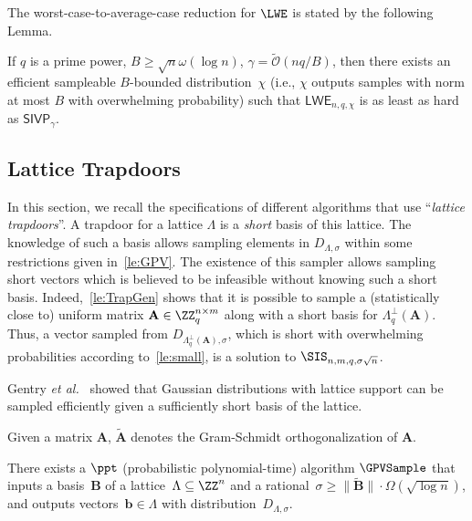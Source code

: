 The worst-case-to-average-case reduction for $\LWE$ is stated by the following Lemma.

\begin{lemma} \label{le:lwe-hard}
  If $q$ is a prime power, $B \geq \sqrt{n}\omega(\log n)$, $\gamma= \widetilde{\mathcal{O}}(nq/B)$, then there exists an efficient sampleable $B$-bounded distribution~$\chi$ ({i.e.}, $\chi$ outputs samples with norm at most $B$ with overwhelming probability) such that $\mathsf{LWE}_{n,q,\chi}$ is as least as hard as $\mathsf{SIVP}_{\gamma}$.
\end{lemma}

\subsection{Lattice Trapdoors}
\label{sse:lattice-trapdoors}

In this section, we recall the specifications of different algorithms that use ``\textit{lattice trapdoors}''.
A trapdoor for a lattice $\Lambda$ is a \textit{short} basis of this lattice.
The knowledge of such a basis allows sampling elements in $D_{\Lambda, \sigma}$ within some restrictions given in~\cref{le:GPV}.
The existence of this sampler allows sampling short vectors which is believed to be infeasible without knowing such a short basis.
Indeed,~\cref{le:TrapGen} shows that it is possible to sample a (statistically close to) uniform matrix $\mathbf{A} \in \ZZ_q^{n \times m}$ along with a short basis for $\Lambda^\perp_{q}(\mathbf{A})$.
Thus, a vector sampled from $D_{\Lambda^\perp_{q}(\mathbf{A}), \sigma}$, which is short with overwhelming probabilities according to~\cref{le:small}, is a solution to $\SIS_{n,m,q,\sigma \sqrt{n}}$.

Gentry {\em et al.}~\cite{GPV08} showed that Gaussian distributions with lattice support can be sampled efficiently given a sufficiently short basis of the lattice.

 Given a matrix $\mathbf{A}$, $\widetilde{\mathbf{A}}$ denotes the Gram-Schmidt orthogonalization of $\mathbf{A}$.

\begin{lemma}
\label{le:GPV}
There exists a $\ppt$ (probabilistic polynomial-time) algorithm $\GPVSample$ that inputs a
basis~$\mathbf{B}$ of a lattice~$\Lambda \subseteq \ZZ^n$ and a
rational~$\sigma \geq  \|\widetilde{\mathbf{B}}\| \cdot \Omega(\sqrt{\log n})$,
and outputs vectors~$\mathbf{b} \in \Lambda$ with distribution~$D_{\Lambda,\sigma}$.
\end{lemma}

